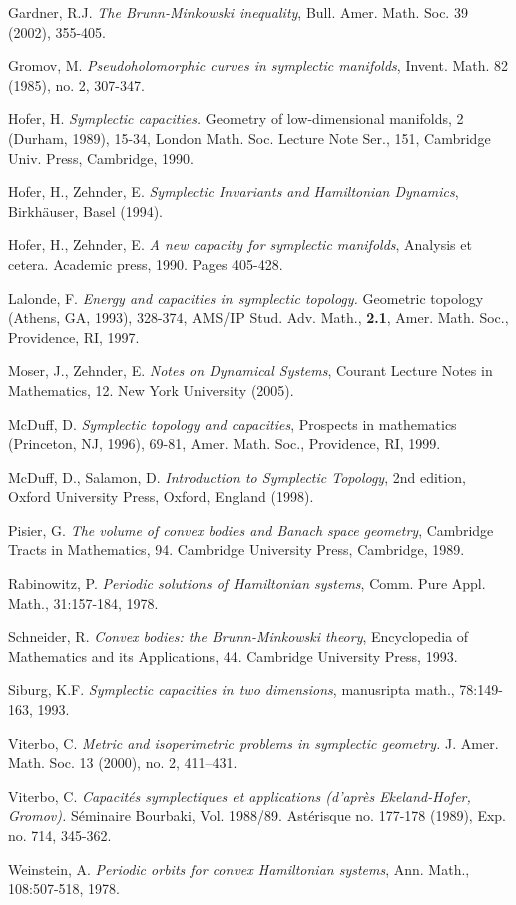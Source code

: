 \documentclass[12pt]{article}
\begin{document}
\begin{thebibliography}{}
 Gardner, R.J. {\it The Brunn-Minkowski inequality}, Bull. Amer. Math. Soc. 39 (2002), 355-405.

 Gromov, M. {\it Pseudoholomorphic curves in symplectic manifolds},
Invent. Math. 82 (1985), no. 2, 307-347.

 Hofer, H. {\it Symplectic capacities.} Geometry of
low-dimensional manifolds, 2 (Durham, 1989), 15-34, London Math.
Soc. Lecture Note Ser., 151, Cambridge Univ. Press, Cambridge,
1990.

 Hofer, H., Zehnder, E. {\it Symplectic Invariants
and Hamiltonian Dynamics}, Birkh\"auser, Basel (1994).

 Hofer, H., Zehnder, E. {\it A new capacity for
symplectic manifolds}, Analysis et cetera. Academic press, 1990.
Pages 405-428.

 Lalonde, F. {\it Energy and capacities in symplectic
topology.} Geometric topology (Athens, GA, 1993), 328-374, AMS/IP
Stud. Adv. Math., {\bf 2.1}, Amer. Math. Soc., Providence, RI, 1997.

 Moser, J., Zehnder, E. {\it Notes on Dynamical Systems},
Courant Lecture Notes in Mathematics, 12. New York University
(2005).

 McDuff, D. {\it Symplectic topology and capacities},
Prospects in mathematics (Princeton, NJ, 1996), 69-81, Amer. Math.
Soc., Providence, RI, 1999.

 McDuff, D., Salamon, D. {\it Introduction to
Symplectic Topology}, 2nd edition, Oxford University Press, Oxford,
England (1998).

  Pisier, G. {\it The volume of convex bodies and Banach space geometry},
Cambridge Tracts in Mathematics, 94. Cambridge University Press,
Cambridge, 1989.

 Rabinowitz, P. {\it Periodic solutions of Hamiltonian
systems}, Comm. Pure Appl. Math., 31:157-184, 1978.

 Schneider, R. {\it Convex bodies: the Brunn-Minkowski theory},
Encyclopedia of Mathematics and its Applications, 44. Cambridge
University Press, 1993.

 Siburg, K.F. {\it Symplectic capacities in two
dimensions}, manusripta math., 78:149-163, 1993.


 Viterbo, C.
{\it Metric and isoperimetric problems in symplectic geometry.} J.
Amer. Math. Soc. 13 (2000), no. 2, 411--431.

 Viterbo, C. {\it Capacit\'es symplectiques
et applications (d'apr\`es Ekeland-Hofer, Gromov).} S\'eminaire
Bourbaki, Vol. 1988/89. Ast\'erisque no.  177-178 (1989), Exp. no.
714, 345-362.

 Weinstein, A. {\it Periodic orbits for convex
Hamiltonian systems}, Ann. Math., 108:507-518, 1978.

\end{thebibliography}
\end{document}
